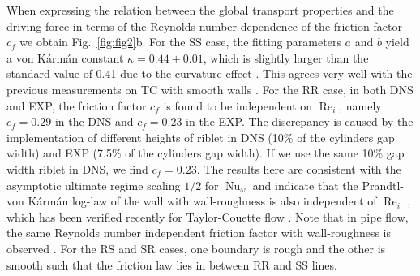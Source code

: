 \documentclass[aps,prl,superscriptaddress,preprint]{revtex4}
\renewcommand{\Re}{\operatorname{Re}}
\newcommand{\Nu}{\operatorname{Nu}_{\omega}}
\begin{document}
When expressing the relation between the global transport properties and the driving force in terms of
 the Reynolds number dependence of the friction factor $c_f$ we obtain  Fig.~\ref{fig:fig2}b. 
 For the SS case, the fitting parameters $a$ and $b$ yield a von K\'arm\'an constant $\kappa=0.44\pm0.01$, which is slightly larger than the standard value of 0.41 due to the curvature effect \cite{hui13,ost16jfm,bra13b}. This agrees  very well with the previous measurements on TC with smooth walls \cite{lew99}. For the RR case, in both DNS and EXP, 
 the friction factor $c_f$ is found to be independent on $\Re_i$, namely $c_f=0.29$ in the DNS and $c_f=0.23$ in the EXP. The discrepancy is caused by the implementation of different heights of riblet in DNS (10\% of the cylinders gap width) and EXP (7.5\% of the cylinders gap width). If we use the same 10\% gap width riblet in DNS, we find $c_f=0.23$. The results here are consistent with the asymptotic ultimate regime scaling $1/2$ for $\Nu$ and indicate that the Prandtl-von K\'arm\'an log-law of the wall \cite{sch00} with wall-roughness is also independent of $\Re_i$ \cite{nik33}, which has been verified recently for Taylor-Couette flow \cite{zhu17}. Note that in pipe flow, the same Reynolds number independent friction factor with wall-roughness is observed \cite{sch00,pop00}. For the RS and SR cases, one boundary is rough and the other is smooth such that the friction law lies in between RR and SS lines.     
\end{document}
